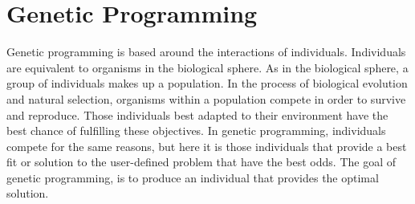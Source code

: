 \documentclass[12pt]{article}
\begin{document}






\section{Genetic Programming} \label{Genetic Programming}

Genetic programming is based around the interactions of individuals. Individuals are equivalent to organisms in the biological sphere. As in the biological sphere, a group of individuals makes up a population. In the process of biological evolution and natural selection, organisms within a population compete in order to survive and reproduce. Those individuals best adapted to their environment have the best chance of fulfilling these objectives.  In genetic programming, individuals compete for the same reasons, but here it is those individuals that provide a best fit or solution to the user-defined problem that have the best odds. The goal of genetic programming, is to produce an individual that provides the optimal solution.
\end{document}
